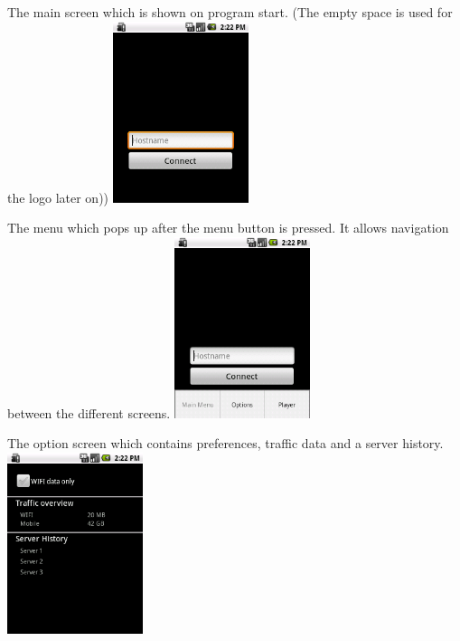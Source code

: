 \documentclass[a4paper,10pt]{scrartcl}
\begin{document}
\begin{illustration}{The main screen which is shown on program start. (The empty space is used for the logo later on))}
\includegraphics[width=150px]{figures/images/mainscreen.png}
\end{illustration}
\begin{illustration}{The menu which pops up after the menu button is pressed. It allows navigation between the different screens.}
\includegraphics[width=150px]{figures/images/menu.png}
\end{illustration}
\begin{illustration}{The option screen which contains preferences, traffic data and a server history.}
\includegraphics[width=150px]{figures/images/optionscreen.png}
\end{illustration}
\end{document}
